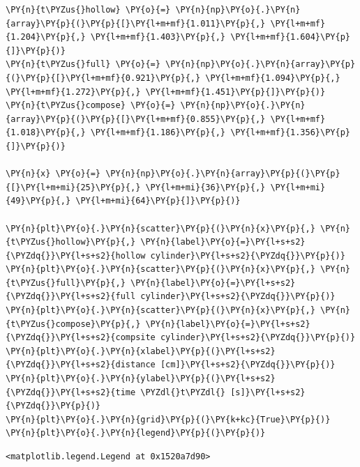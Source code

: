     \begin{tcolorbox}[breakable, size=fbox, boxrule=1pt, pad at break*=1mm,colback=cellbackground, colframe=cellborder]
\begin{Verbatim}[commandchars=\\\{\}]
\PY{n}{t\PYZus{}hollow} \PY{o}{=} \PY{n}{np}\PY{o}{.}\PY{n}{array}\PY{p}{(}\PY{p}{[}\PY{l+m+mf}{1.011}\PY{p}{,} \PY{l+m+mf}{1.204}\PY{p}{,} \PY{l+m+mf}{1.403}\PY{p}{,} \PY{l+m+mf}{1.604}\PY{p}{]}\PY{p}{)}
\PY{n}{t\PYZus{}full} \PY{o}{=} \PY{n}{np}\PY{o}{.}\PY{n}{array}\PY{p}{(}\PY{p}{[}\PY{l+m+mf}{0.921}\PY{p}{,} \PY{l+m+mf}{1.094}\PY{p}{,} \PY{l+m+mf}{1.272}\PY{p}{,} \PY{l+m+mf}{1.451}\PY{p}{]}\PY{p}{)}
\PY{n}{t\PYZus{}compose} \PY{o}{=} \PY{n}{np}\PY{o}{.}\PY{n}{array}\PY{p}{(}\PY{p}{[}\PY{l+m+mf}{0.855}\PY{p}{,} \PY{l+m+mf}{1.018}\PY{p}{,} \PY{l+m+mf}{1.186}\PY{p}{,} \PY{l+m+mf}{1.356}\PY{p}{]}\PY{p}{)}

\PY{n}{x} \PY{o}{=} \PY{n}{np}\PY{o}{.}\PY{n}{array}\PY{p}{(}\PY{p}{[}\PY{l+m+mi}{25}\PY{p}{,} \PY{l+m+mi}{36}\PY{p}{,} \PY{l+m+mi}{49}\PY{p}{,} \PY{l+m+mi}{64}\PY{p}{]}\PY{p}{)}

\PY{n}{plt}\PY{o}{.}\PY{n}{scatter}\PY{p}{(}\PY{n}{x}\PY{p}{,} \PY{n}{t\PYZus{}hollow}\PY{p}{,} \PY{n}{label}\PY{o}{=}\PY{l+s+s2}{\PYZdq{}}\PY{l+s+s2}{hollow cylinder}\PY{l+s+s2}{\PYZdq{}}\PY{p}{)}
\PY{n}{plt}\PY{o}{.}\PY{n}{scatter}\PY{p}{(}\PY{n}{x}\PY{p}{,} \PY{n}{t\PYZus{}full}\PY{p}{,} \PY{n}{label}\PY{o}{=}\PY{l+s+s2}{\PYZdq{}}\PY{l+s+s2}{full cylinder}\PY{l+s+s2}{\PYZdq{}}\PY{p}{)}
\PY{n}{plt}\PY{o}{.}\PY{n}{scatter}\PY{p}{(}\PY{n}{x}\PY{p}{,} \PY{n}{t\PYZus{}compose}\PY{p}{,} \PY{n}{label}\PY{o}{=}\PY{l+s+s2}{\PYZdq{}}\PY{l+s+s2}{compsite cylinder}\PY{l+s+s2}{\PYZdq{}}\PY{p}{)}
\PY{n}{plt}\PY{o}{.}\PY{n}{xlabel}\PY{p}{(}\PY{l+s+s2}{\PYZdq{}}\PY{l+s+s2}{distance [cm]}\PY{l+s+s2}{\PYZdq{}}\PY{p}{)}
\PY{n}{plt}\PY{o}{.}\PY{n}{ylabel}\PY{p}{(}\PY{l+s+s2}{\PYZdq{}}\PY{l+s+s2}{time \PYZdl{}t\PYZdl{} [s]}\PY{l+s+s2}{\PYZdq{}}\PY{p}{)}
\PY{n}{plt}\PY{o}{.}\PY{n}{grid}\PY{p}{(}\PY{k+kc}{True}\PY{p}{)}
\PY{n}{plt}\PY{o}{.}\PY{n}{legend}\PY{p}{(}\PY{p}{)}
\end{Verbatim}
\end{tcolorbox}

            \begin{tcolorbox}[breakable, size=fbox, boxrule=.5pt, pad at break*=1mm, opacityfill=0]
\begin{Verbatim}[commandchars=\\\{\}]
<matplotlib.legend.Legend at 0x1520a7d90>
\end{Verbatim}
\end{tcolorbox}
        
